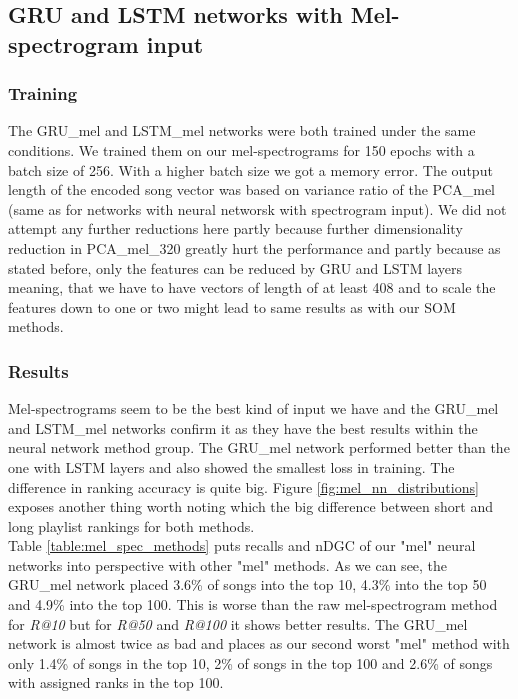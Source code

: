 \subsection{GRU and LSTM networks with Mel-spectrogram input}

\subsubsection{Training}
The GRU\_mel and LSTM\_mel networks were both trained under the same conditions. We trained them on our mel-spectrograms for 150 epochs with a batch size of 256. With a higher batch size we got a memory error. The output length of the encoded song vector was based on variance ratio of the PCA\_mel (same as for networks with neural networsk with spectrogram input). We did not attempt any further reductions here partly because further dimensionality reduction in PCA\_mel\_320 greatly hurt the performance and partly because as stated before, only the features can be reduced by GRU and LSTM layers meaning, that we have to have vectors of length of at least 408 and to scale the features down to one or two might lead to same results as with our SOM methods.

\subsubsection{Results}
Mel-spectrograms seem to be the best kind of input we have and the GRU\_mel and LSTM\_mel networks confirm it as they have the best results within the neural network method group. The GRU\_mel network performed better than the one with LSTM layers and also showed the smallest loss in training. The difference in ranking accuracy is quite big. Figure \ref{fig:mel_nn_distributions} exposes another thing worth noting which the big difference between short and long playlist rankings for both methods. \\
Table \ref{table:mel_spec_methods} puts recalls and nDGC of our "mel" neural networks into perspective with other "mel" methods.
As we can see, the GRU\_mel network placed 3.6\% of songs into the top 10, 4.3\% into the top 50 and 4.9\% into the top 100. This is worse than the raw mel-spectrogram method for \textit{R@10} but for \textit{R@50} and \textit{R@100} it shows better results. The GRU\_mel network is almost twice as bad and places as our second worst "mel" method with only 1.4\% of songs in the top 10, 2\% of songs in the top 100 and 2.6\% of songs with assigned ranks in the top 100.

